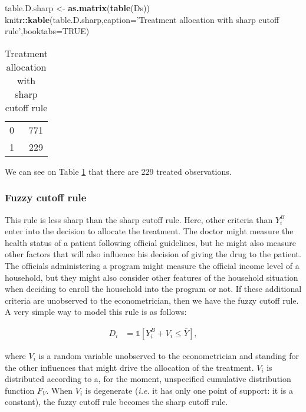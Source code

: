 \documentclass[]{book}
\newenvironment{Shaded}{\begin{snugshade}}{\end{snugshade}}
\newcommand{\KeywordTok}[1]{\textcolor[rgb]{0.13,0.29,0.53}{\textbf{#1}}}
\newcommand{\DataTypeTok}[1]{\textcolor[rgb]{0.13,0.29,0.53}{#1}}
\newcommand{\StringTok}[1]{\textcolor[rgb]{0.31,0.60,0.02}{#1}}
\newcommand{\OtherTok}[1]{\textcolor[rgb]{0.56,0.35,0.01}{#1}}
\newcommand{\OperatorTok}[1]{\textcolor[rgb]{0.81,0.36,0.00}{\textbf{#1}}}
\newcommand{\NormalTok}[1]{#1}
\newcommand{\uns}[1]{\mathds{1}[ #1 ]}
\theoremstyle{definition}
\theoremstyle{definition}
\theoremstyle{definition}
\theoremstyle{remark}
\begin{document}
\begin{Shaded}
\begin{Highlighting}[]
\NormalTok{table.D.sharp <-}\StringTok{ }\KeywordTok{as.matrix}\NormalTok{(}\KeywordTok{table}\NormalTok{(Ds))}
\NormalTok{knitr}\OperatorTok{::}\KeywordTok{kable}\NormalTok{(table.D.sharp,}\DataTypeTok{caption=}\StringTok{'Treatment allocation with sharp cutoff rule'}\NormalTok{,}\DataTypeTok{booktabs=}\OtherTok{TRUE}\NormalTok{)}
\end{Highlighting}
\end{Shaded}

\begin{table}

\caption{\label{tab:tableDsharp}Treatment allocation with sharp cutoff rule}
\centering
\begin{tabular}[t]{lr}
\toprule
0 & 771\\
1 & 229\\
\bottomrule
\end{tabular}
\end{table}

We can see on Table \ref{tab:tableDsharp} that there are 229 treated
observations.

\subsubsection{Fuzzy cutoff rule}\label{fuzzy-cutoff-rule}

This rule is less sharp than the sharp cutoff rule. Here, other criteria
than \(Y_i^B\) enter into the decision to allocate the treatment. The
doctor might measure the health status of a patient following official
guidelines, but he might also measure other factors that will also
influence his decision of giving the drug to the patient. The officials
administering a program might measure the official income level of a
household, but they might also consider other features of the household
situation when deciding to enroll the household into the program or not.
If these additional criteria are unobserved to the econometrician, then
we have the fuzzy cutoff rule. A very simple way to model this rule is
as follows:

\begin{align}\label{eq:fuzzcutoff}
  D_i & = \uns{Y_i^B+V_i\leq\bar{Y}},
\end{align}

where \(V_i\) is a random variable unobserved to the econometrician and
standing for the other influences that might drive the allocation of the
treatment. \(V_i\) is distributed according to a, for the moment,
unspecified cumulative distribution function \(F_V\). When \(V_i\) is
degenerate (\textit{i.e.} it has only one point of support: it is a
constant), the fuzzy cutoff rule becomes the sharp cutoff rule.
\end{document}
